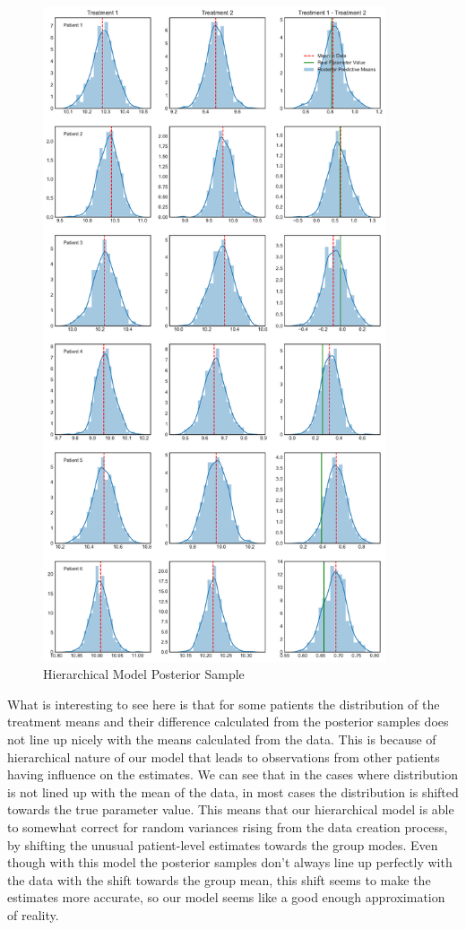 \documentclass[12pt,a4paper,leqno]{report}
\theoremstyle{plain}
\theoremstyle{definition}
\theoremstyle{remark}
\begin{document}
\begin{figure}[H]
    \caption{Hierarchical Model Posterior Sample}\label{hierarchicalmodelposteriorsampling}
    \bigskip
    \centering
    \includegraphics[width=\textwidth,height=7.6in,keepaspectratio]{hierarchical_model_posterior_sampling.pdf}
\end{figure}

What is interesting to see here is that for some patients the distribution of the
treatment means and their difference calculated from the posterior samples does not line
up nicely with the means calculated from the data. This is because of hierarchical
nature of our model that leads to observations from other patients having influence on
the estimates. We can see that in the cases where distribution is not lined up with the
mean of the data, in most cases the distribution is shifted towards the true parameter
value. This means that our hierarchical model is able to somewhat correct for random
variances rising from the data creation process, by shifting the unusual patient-level
estimates towards the group modes. Even though with this model the posterior samples
don't always line up perfectly with the data with the shift towards the group mean, this
shift seems to make the estimates more accurate, so our model seems like a good enough
approximation of reality.
\end{document}
